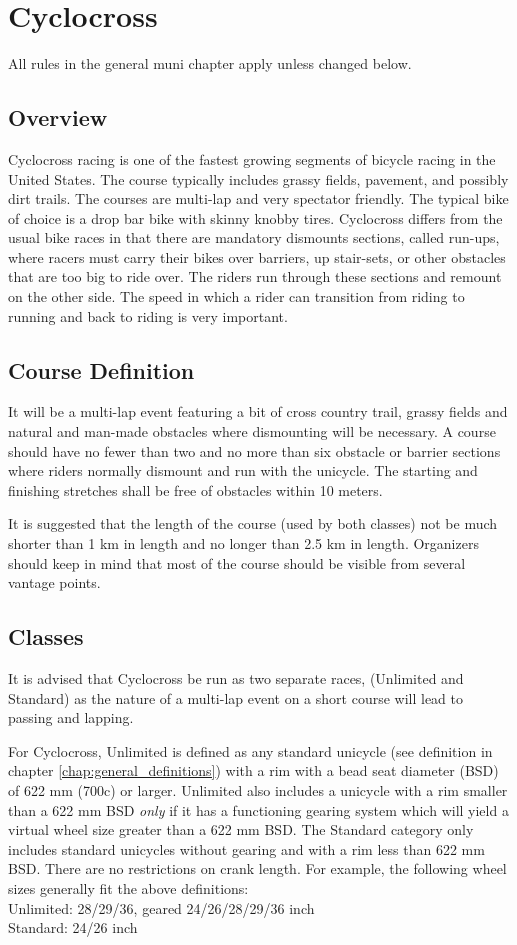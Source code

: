 \chapter{Cyclocross \label{chap:cyclocross} \setcounter{chapter}{1}}

All rules in the general muni chapter apply unless changed below.

\section{Overview}
Cyclocross racing is one of the fastest growing segments of bicycle racing in the United States.
The course typically includes grassy fields, pavement, and possibly dirt trails.
The courses are multi-lap and very spectator friendly.
The typical bike of choice is a drop bar bike with skinny knobby tires.
Cyclocross differs from the usual bike races in that there are mandatory dismounts sections, called run-ups, where racers must carry their bikes over barriers, up stair-sets, or other obstacles that are too big to ride over.
The riders run through these sections and remount on the other side.
The speed in which a rider can transition from riding to running and back to riding is very important.

\section{Course Definition}
It will be a multi-lap event featuring a bit of cross country trail, grassy fields and natural and man-made obstacles where dismounting will be necessary.
A course should have no fewer than two and no more than six obstacle or barrier sections where riders normally dismount and run with the unicycle.
The starting and finishing stretches shall be free of obstacles within 10 meters.

It is suggested that the length of the course (used by both classes) not be much shorter than 1 km in length and no longer than 2.5 km in length. 
Organizers should keep in mind that most of the course should be visible from several vantage points.

\section{Classes}
It is advised that Cyclocross be run as two separate races, (Unlimited and Standard) as the nature of a multi-lap event on a short course will lead to passing and lapping.

For Cyclocross, Unlimited is defined as any standard unicycle (see definition in chapter \ref{chap:general_definitions}) with a rim with a bead seat diameter (BSD) of 622 mm (700c) or larger.
Unlimited also includes a unicycle with a rim smaller than a 622 mm BSD {\em only} if it has a functioning gearing system which will yield a virtual wheel size greater than a 622 mm BSD.
The Standard category only includes standard unicycles without gearing and with a rim less than 622 mm BSD.
There are no restrictions on crank length.
For example, the following wheel sizes generally fit the above definitions: \\
Unlimited: 28/29/36, geared 24/26/28/29/36 inch \\
Standard: 24/26 inch

